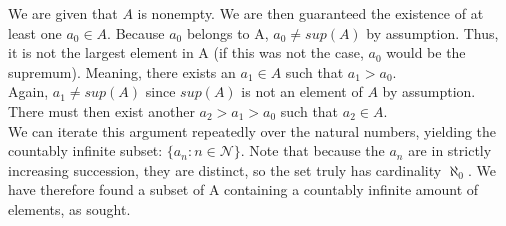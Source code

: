 \documentclass[11 pt]{article}
\begin{document}
\begin{solution}
	We are given that $A$ is nonempty. We are then guaranteed the existence of at least one $a_0\in A$. Because $a_0$ belongs to A, $a_0\neq sup(A)$ by assumption. Thus, it is not the largest element in A (if this was not the case, $a_0$ would be the supremum). Meaning, there exists an $a_1\in A$ such that $a_1>a_0$. \\
	Again, $a_1\neq sup(A)$ since $sup(A)$ is not an element of $A$ by assumption. There must then exist another $a_2>a_1>a_0$ such that  $a_2\in A$. \\
	We can iterate this argument repeatedly over the natural numbers, yielding the countably infinite subset: $\{a_n:n\in\mathcal{N}\}$. Note that because the $a_n$ are in strictly increasing succession, they are distinct, so the set truly has cardinality $\aleph_0$.
	We have therefore found a subset of A containing a countably infinite amount of elements, as sought.
\end{solution}
\end{document}
